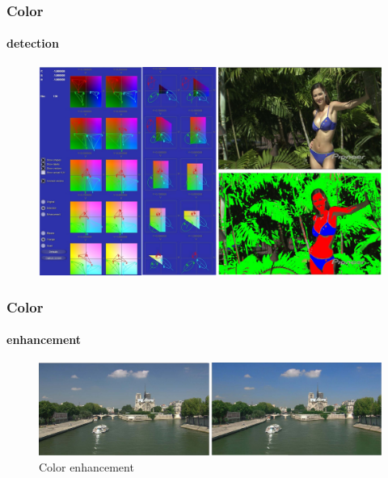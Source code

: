 \begin{frame}
\frametitle{Color}
\framesubtitle{detection}
\logoCSIPCPL\mypagenum
	\begin{figure}		
		\centering		
		\includegraphics[width=1.0\textwidth]{figs/Proposal_fig14_TRK_colorDetection.pdf}
		\label{fig:color_detection}
	\end{figure}
\end{frame}


\begin{frame}
\frametitle{Color}
\framesubtitle{enhancement}
\logoCSIPCPL\mypagenum
	\begin{figure}		
		\centering		
		\includegraphics[width=1.0\textwidth]{figs/Proposal_fig15_TRK_colorEnhancement.pdf}
		\caption{Color enhancement}
		\label{fig:color_enhancement}
	\end{figure}
\end{frame}

